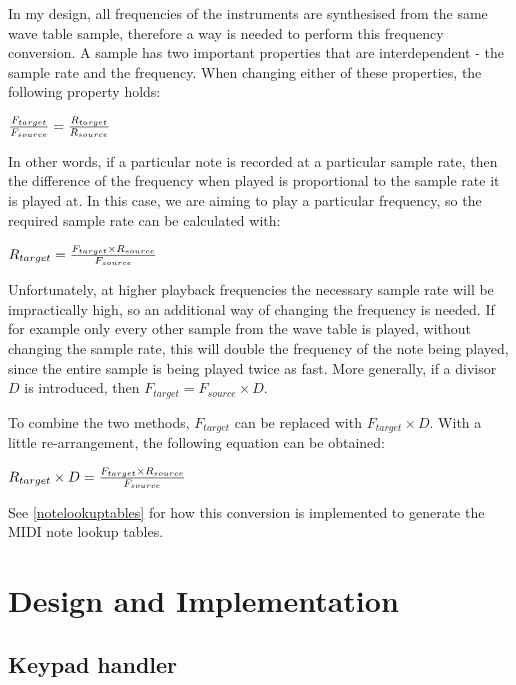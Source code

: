 \documentclass[a4paper,10pt]{article}
\begin{document}
In my design, all frequencies of the instruments are synthesised from the same wave table sample, 
therefore a way is needed to perform this frequency conversion.  A sample has two important 
properties that are interdependent - the sample rate and the frequency.  When changing either of 
these properties, the following property holds:

\begin{center}
${{F_{target}} \over {F_{source}}} = {{R_{target}} \over {R_{source}}}$
\end{center}

In other words, if a particular note is recorded at a particular sample rate, then the difference of 
the frequency when played is proportional to the sample rate it is played at.  In this case, we are 
aiming to play a particular frequency, so the required sample rate can be calculated with:

\begin{center}
${{R_{target}} = {{F_{target} \times {R_{source}}} \over {F_{source}}}}$
\end{center}

Unfortunately, at higher playback frequencies the necessary sample rate will be impractically high, 
so an additional way of changing the frequency is needed.  If for example only every other sample 
from the wave table is played, without changing the sample rate, this will double the frequency of 
the note being played, since the entire sample is being played twice as fast.  More generally, if a 
divisor $D$ is introduced, then ${F_{target}} = {F_{source} \times D}$.

To combine the two methods, $F_{target}$ can be replaced with ${F_{target}} \times D$.  With a 
little re-arrangement, the following equation can be obtained:

\begin{center}
${{R_{target}} \times D} = {{{F_{target} \times {R_{source}}} \over {F_{source}}}}$
\end{center}

See \ref{notelookuptables} for how this conversion is implemented to generate the MIDI note lookup 
tables.

\pagebreak
\section{Design and Implementation}

\subsection{Keypad handler}
\end{document}
